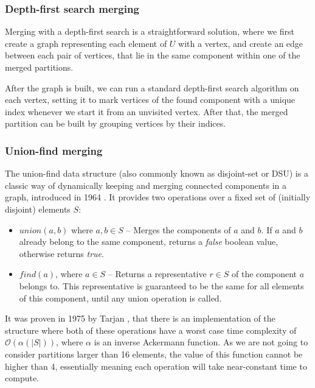 \documentclass[thesis=M,english,hidelinks]{FITthesis}[2012/10/20]
\theoremstyle{definition}
\begin{document}
\subsubsection*{Depth-first search merging}

Merging with a depth-first search is a straightforward solution, where we first create a graph representing each
element of $U$ with a vertex, and create an edge between each pair of vertices, that lie in the same component
within one of the merged partitions.

After the graph is built, we can run a standard depth-first search algorithm on each vertex, setting it to mark vertices
of the found component with a unique index whenever we start it from an unvisited vertex. After that, the merged
partition can be built by grouping vertices by their indices.

\subsubsection*{Union-find merging}

The union-find data structure (also commonly known as disjoint-set or DSU) is a classic way of dynamically keeping and
merging connected components in a graph, introduced in 1964 \cite{Galler1964}. It provides two operations over a fixed
set of (initially disjoint) elements $S$:

\begin{itemize}
    \item $union(a, b)$ where $a, b \in S$ -- Merges the components of $a$ and $b$. If $a$ and $b$ already belong
        to the same component, returns a \emph{false} boolean value, otherwise returns \emph{true}.

    \item $find(a)$, where $a \in S$ -- Returns a representative $r \in S$ of the component $a$ belongs to. This
        representative is guaranteed to be the same for all elements of this component, until any union operation is
        called.
\end{itemize}

It was proven in 1975 by Tarjan \cite{Tarjan1975}, that there is an implementation of the structure where both of these
operations have a worst case time complexity of $\mathcal{O}(\alpha(|S|))$, where $\alpha$ is an inverse Ackermann
function. As we are not going to consider partitions larger than 16 elements, the value of this function cannot be
higher than 4, essentially meaning each operation will take near-constant time to compute.
\end{document}
